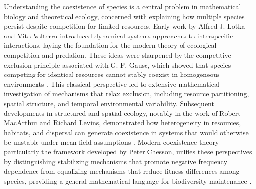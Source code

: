 \documentclass{article}
\begin{document}
Understanding the coexistence of species is a central problem in mathematical biology and theoretical ecology, concerned with explaining how multiple species persist despite competition for limited resources. Early work by Alfred J. Lotka and Vito Volterra \cite{lotka1925elements,volterra1926fluctuations} introduced dynamical systems approaches to interspecific interactions, laying the foundation for the modern theory of ecological competition and predation. These ideas were sharpened by the competitive exclusion principle associated with G. F. Gause, which showed that species competing for identical resources cannot stably coexist in homogeneous environments \cite{gause1934struggle}. This classical perspective led to extensive mathematical investigation of mechanisms that relax exclusion, including resource partitioning, spatial structure, and temporal environmental variability. Subsequent developments in structured and spatial ecology, notably in the work of Robert MacArthur and Richard Levins, demonstrated how heterogeneity in resources, habitats, and dispersal can generate coexistence in systems that would otherwise be unstable under mean-field assumptions \cite{macarthur1967limiting}. Modern coexistence theory, particularly the framework developed by Peter Chesson, unifies these perspectives by distinguishing stabilizing mechanisms that promote negative frequency dependence from equalizing mechanisms that reduce fitness differences among species, providing a general mathematical language for biodiversity maintenance \cite{chesson1985coexistence,chesson2000mechanisms}.
\end{document}

